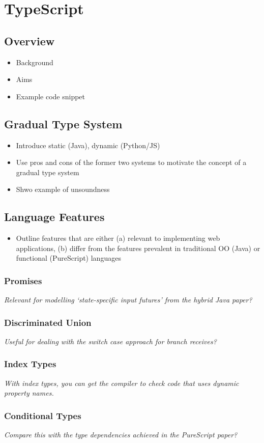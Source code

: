 \section{TypeScript}

\subsection{Overview}
\begin{itemize}
\item Background
\item Aims
\item Example code snippet
\end{itemize}

\subsection{Gradual Type System}
\begin{itemize}
\item Introduce static (Java), dynamic (Python/JS)
\item Use pros and cons of the former two systems to motivate the concept of a gradual type system
\item Shwo example of unsoundness
\end{itemize}

\subsection{Language Features}
\begin{itemize}
\item Outline features that are either (a) relevant to implementing web applications, (b) differ from the features prevalent in traditional OO (Java) or functional (PureScript) languages
\end{itemize}

\subsubsection{Promises}
\textit{Relevant for modelling `state-specific input futures' from the hybrid Java paper?}

\subsubsection{Discriminated Union}
\textit{Useful for dealing with the switch case approach for branch receives?}

\subsubsection{Index Types}
\textit{With index types, you can get the compiler to check code that uses dynamic property names.}

\subsubsection{Conditional Types}
\textit{Compare this with the type dependencies achieved in the PureScript paper?}
